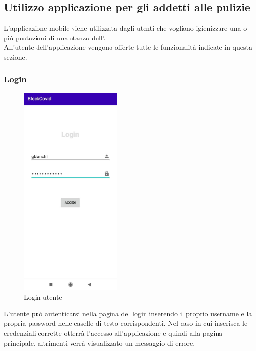 	
	\subsection{Utilizzo applicazione per gli addetti alle pulizie}
	L'applicazione mobile viene utilizzata dagli utenti che vogliono igienizzare una o più postazioni di una stanza dell'. 
	\\All'utente dell'applicazione vengono offerte tutte le funzionalità indicate in questa sezione.
	\subsubsection{Login}
	\begin{figure}[H]
		\centering
		\includegraphics[width=5cm]{res/images/loginAddetto.png}
		\caption{Login utente}
	\end{figure}
	L'utente può autenticarsi nella pagina del login inserendo il proprio username e la propria password nelle caselle di testo corrispondenti.
	Nel caso in cui inserisca le credenziali corrette otterrà l'accesso all'applicazione e quindi alla pagina principale, altrimenti verrà visualizzato un messaggio di errore.
